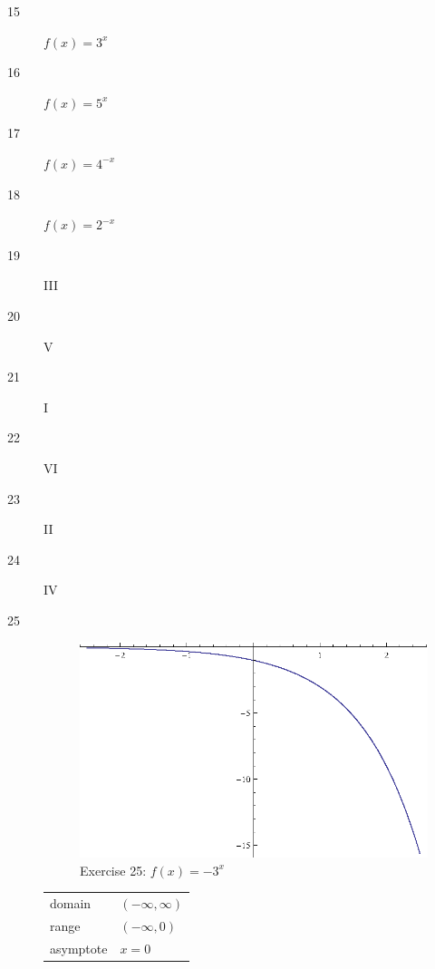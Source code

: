 \documentclass{exam}
\begin{document}
\begin{description}
      \item[15] $f(x) = 3^x$

      \item[16] $f(x) = 5^x$

      \item[17] $f(x) = 4^{-x}$

      \item[18] $f(x) = 2^{-x}$

      \item[19] III

      \item[20] V

      \item[21] I

      \item[22] VI

      \item[23] II

      \item[24] IV

      \item[25] 
        \begin{figure}[H]
          \centering
          \includegraphics[scale=1.0]{exercise25.eps}
          \caption*{Exercise 25: $f(x) = -3^x$}
        \end{figure}

        \begin{tabular}[H]{ll}
          \toprule
          domain    & $(-\infty, \infty)$ \\
          range     & $(-\infty, 0)$ \\
          asymptote & $x = 0$ \\
          \bottomrule
        \end{tabular}


\end{description}
\end{document}
